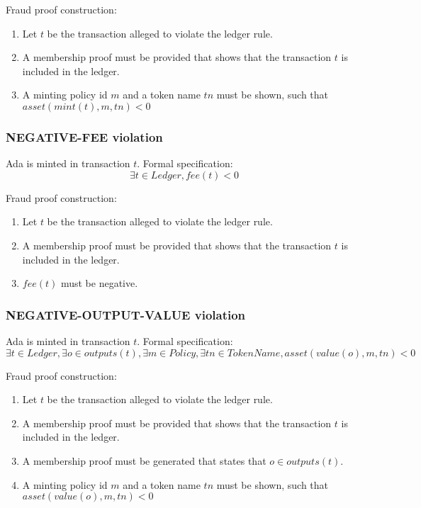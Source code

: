 \documentclass[../midgard.tex]{subfiles}
\begin{document}
Fraud proof construction:
\begin{enumerate}
  \item Let $t$ be the transaction alleged to violate the ledger rule.
  \item A membership proof must be provided that shows that the transaction $t$ is included in the ledger.
  \item A minting policy id $m$ and a token name $tn$ must be shown, such that $asset(mint(t), m, tn) < 0$
\end{enumerate}

\subsubsection{NEGATIVE-FEE violation}
\label{violation:NEGATIVE-FEE}
Ada is minted in transaction $t$.
Formal specification:
\begin{equation*}
  \exists t \in Ledger, fee(t) < 0
\end{equation*}

Fraud proof construction:
\begin{enumerate}
  \item Let $t$ be the transaction alleged to violate the ledger rule.
  \item A membership proof must be provided that shows that the transaction $t$ is included in the ledger.
  \item $fee(t)$ must be negative.
\end{enumerate}

\subsubsection{NEGATIVE-OUTPUT-VALUE violation}
\label{violation:NEGATIVE-OUTPUT-VALUE}
Ada is minted in transaction $t$.
Formal specification:
\begin{equation*}
  \exists t \in Ledger, \exists o \in outputs(t), \exists m \in Policy, \exists tn \in TokenName, asset(value(o), m, tn) < 0
\end{equation*}

Fraud proof construction:
\begin{enumerate}
  \item Let $t$ be the transaction alleged to violate the ledger rule.
  \item A membership proof must be provided that shows that the transaction $t$ is included in the ledger.
  \item A membership proof must be generated that states that $o \in outputs(t)$.
  \item A minting policy id $m$ and a token name $tn$ must be shown, such that $asset(value(o), m, tn) < 0$
\end{enumerate}
\end{document}
